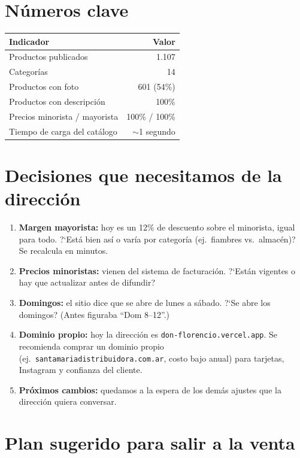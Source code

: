 \documentclass[a4paper,11pt]{article}
\begin{document}
\section{N\'umeros clave}

\begin{table}[h]
\centering
\begin{tabular}{lr}
\toprule
\textbf{Indicador} & \textbf{Valor} \\
\midrule
Productos publicados & 1.107 \\
Categor\'ias & 14 \\
Productos con foto & 601 (54\%) \\
Productos con descripci\'on & 100\% \\
Precios minorista / mayorista & 100\% / 100\% \\
Tiempo de carga del cat\'alogo & $\sim$1 segundo \\
\bottomrule
\end{tabular}
\end{table}

\section{Decisiones que necesitamos de la direcci\'on}

\begin{enumerate}[leftmargin=1.4em, itemsep=4pt]
  \item \textbf{Margen mayorista:} hoy es un 12\% de descuento sobre el minorista, igual para todo. ?`Est\'a bien as\'i o var\'ia por categor\'ia (ej.\ fiambres vs.\ almac\'en)? Se recalcula en minutos.
  \item \textbf{Precios minoristas:} vienen del sistema de facturaci\'on. ?`Est\'an vigentes o hay que actualizar antes de difundir?
  \item \textbf{Domingos:} el sitio dice que se abre de lunes a s\'abado. ?`Se abre los domingos? (Antes figuraba ``Dom 8--12''.)
  \item \textbf{Dominio propio:} hoy la direcci\'on es \texttt{don-florencio.vercel.app}. Se recomienda comprar un dominio propio (ej.\ \texttt{santamariadistribuidora.com.ar}, costo bajo anual) para tarjetas, Instagram y confianza del cliente.
  \item \textbf{Pr\'oximos cambios:} quedamos a la espera de los dem\'as ajustes que la direcci\'on quiera conversar.
\end{enumerate}

\section{Plan sugerido para salir a la venta}
\end{document}
